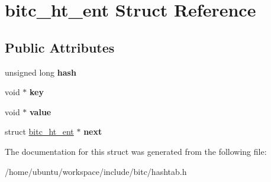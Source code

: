 \hypertarget{structbitc__ht__ent}{\section{bitc\-\_\-ht\-\_\-ent Struct Reference}
\label{structbitc__ht__ent}
}
\subsection*{Public Attributes}
\begin{DoxyCompactItemize}
\item 
\hypertarget{structbitc__ht__ent_a53cc3cb4c7e4cdc9301e112c11db5e3c}{unsigned long {\bfseries hash}}\label{structbitc__ht__ent_a53cc3cb4c7e4cdc9301e112c11db5e3c}

\item 
\hypertarget{structbitc__ht__ent_a3300d3b55fb5267ff45d4eaf4087dd9c}{void $\ast$ {\bfseries key}}\label{structbitc__ht__ent_a3300d3b55fb5267ff45d4eaf4087dd9c}

\item 
\hypertarget{structbitc__ht__ent_ab5359c19c137f5c6fa757cc76d1eaaa4}{void $\ast$ {\bfseries value}}\label{structbitc__ht__ent_ab5359c19c137f5c6fa757cc76d1eaaa4}

\item 
\hypertarget{structbitc__ht__ent_a11f6344b39afede1ac66dfab7de093a2}{struct \hyperlink{structbitc__ht__ent}{bitc\-\_\-ht\-\_\-ent} $\ast$ {\bfseries next}}\label{structbitc__ht__ent_a11f6344b39afede1ac66dfab7de093a2}

\end{DoxyCompactItemize}


The documentation for this struct was generated from the following file\-:\begin{DoxyCompactItemize}
\item 
/home/ubuntu/workspace/include/bitc/hashtab.\-h\end{DoxyCompactItemize}
